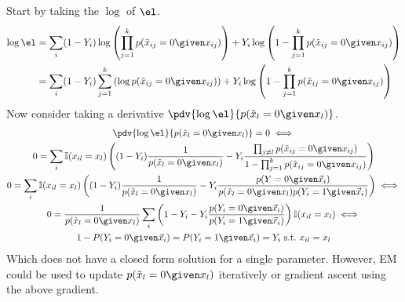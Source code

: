 Start by taking the $\log$ of $\el$.
\begin{align*}
    \log\el &=
        \sum_i (1 - Y_i) \log\left(\prod_{j=1}^k p(\Tilde{x}_{ij} =0 \given x_{ij}) \right) + Y_i \log\left( 1 - \prod_{j=1}^k p(\Tilde{x}_{ij} =0 \given x_{ij}) \right)\\
        &= \sum_i (1 - Y_i) \sum_{j=1}^k \left(\log p(\Tilde{x}_{ij} = 0 \given x_{ij})\right) + Y_i \log\left( 1 - \prod_{j=1}^k p(\Tilde{x}_{ij} =0 \given x_{ij}) \right)\\
\end{align*}
Now consider taking a derivative $\pdv{\log\el}{p(\Tilde{x}_{l} =0 \given x_{l})}$.
\begin{gather*}
    \pdv{\log\el}{p(\Tilde{x}_{l} =0 \given x_{l})} = 0 \iff\\
    0 = \sum_i \mathbb{I}(x_{il}=x_l)\left((1 - Y_i) \frac{1}{ p(\Tilde{x}_{l} =0 \given x_{l})} - Y_i \frac{\prod_{j \neq l} p(\Tilde{x}_{ij} =0 \given x_{ij})}{1  - \prod_{j=1}^k p(\Tilde{x}_{ij} =0 \given x_{ij})} \right)\\
    0 = \sum_i \mathbb{I}(x_{il}=x_l) \left( (1 - Y_i) \frac{1}{p(\Tilde{x}_l = 0 \given x_l)} - Y_i \frac{p(Y = 0 \given \vec{x}_i)}{p(\Tilde{x}_l = 0 \given x_l) p(Y_i = 1 \given \vec{x}_i)}  \right) \iff\\
    0 = \frac{1}{p(\Tilde{x}_l = 0 \given x_l)} \sum_i \left(1 - Y_i - Y_i \frac{p(Y_i = 0 \given \vec{x}_i)}{p(Y_i = 1 \given \vec{x}_i)} \right)\mathbb{I}(x_{il} = x_l) \iff\\
    1 - P(Y_i = 0 \given \vec{x}_i) = P(Y_i = 1 \given \vec{x}_i) = Y_i ~\text{s.t.}~x_{il} = x_l
\end{gather*}
Which does not have a closed form solution for a single parameter. However, EM could be used to update $p(\Tilde{x}_l = 0 \given x_l)$ iteratively or gradient ascent using the above gradient.